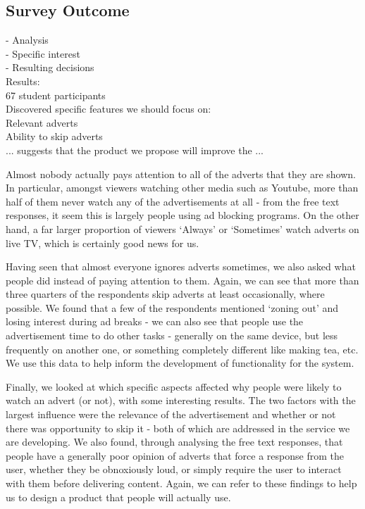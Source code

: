 \subsection{Survey Outcome}



 - Analysis\\
  - Specific interest\\
  - Resulting decisions\\

Results:\\
67 student participants\\
Discovered specific features we should focus on:\\
Relevant adverts\\
Ability to skip adverts\\
... suggests that the product we propose will improve the ...

Almost nobody actually pays attention to all of the adverts that they are shown. In particular, amongst viewers watching other media such as Youtube, more than half of them never watch any of the advertisements at all - from the free text responses, it seem this is largely people using ad blocking programs. On the other hand, a far larger proportion of viewers `Always' or `Sometimes' watch adverts on live TV, which is certainly good news for us.

Having seen that almost everyone ignores adverts sometimes, we also asked what people did instead of paying attention to them. Again, we can see that more than three quarters of the respondents skip adverts at least occasionally, where possible. We found that a few of the respondents mentioned `zoning out' and losing interest during ad breaks - we can also see that people use the advertisement time to do other tasks - generally on the same device, but less frequently on another one, or something completely different like making tea, etc. We use this data to help inform the development of functionality for the system.

Finally, we looked at which specific aspects affected why people were likely to watch an advert (or not), with some interesting results. The two factors with the largest influence were the relevance of the advertisement and whether or not there was opportunity to skip it - both of which are addressed in the service we are developing. We also found, through analysing the free text responses, that people have a generally poor opinion of adverts that force a response from the user, whether they be obnoxiously loud, or simply require the user to interact with them before delivering content. Again, we can refer to these findings to help us to design a product that people will actually use. 